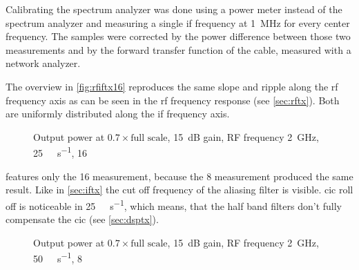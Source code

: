 \documentclass[12pt,a4paper,parskip=full,abstracton]{scrartcl}
\begin{document}
Calibrating the spectrum analyzer was done using a power meter instead of the
spectrum analyzer and measuring a single \gls{if} frequency at
\SI{1}{\mega\hertz} for every center frequency. The samples were corrected
by the power difference between those two measurements and by the forward
transfer function of the cable, measured with a network analyzer.

The overview in \cref{fig:rfiftx16} reproduces the same slope and ripple
along the \gls{rf} frequency axis as can be seen in the \gls{rf} frequency response
(see \cref{sec:rftx}). Both are uniformly distributed along the \gls{if} frequency axis.

\begin{figure}[htb]
    \centering
{}
    \caption{Output power at $0.7 \times \text{full scale}$, \SI{15}{\deci\bel} gain, RF frequency \SI{2}{\giga\hertz}, \SI{25}{\mega\samples\per\second}, \SI{16}{\bit}}
    \label{fig:iftx}
\end{figure}

 features only the \SI{16}{\bit} measurement, because the \SI{8}{\bit}
measurement produced the same result. Like in \cref{sec:iftx} the cut off frequency
of the aliasing filter is visible. \gls{cic} roll off is noticeable in
\SI{25}{\mega\samples\per\second}, which means, that the half band filters don't fully
compensate the \gls{cic} (see \cref{sec:dsptx}).

\begin{figure}[htb]
    \centering
{}
    \caption{Output power at $0.7 \times \text{full scale}$, \SI{15}{\deci\bel} gain, RF frequency \SI{2}{\giga\hertz}, \SI{50}{\mega\samples\per\second}, \SI{8}{\bit}}
    \label{fig:iftx50}
\end{figure}
\end{document}
